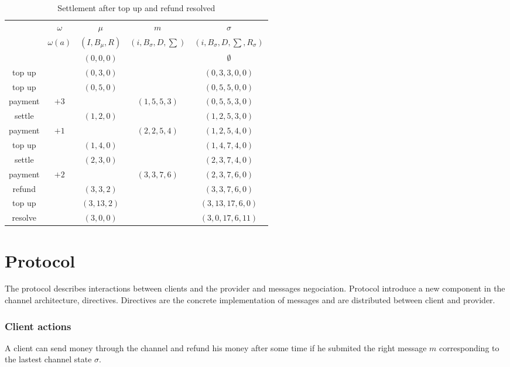 \documentclass{llncs}
\begin{document}
\begin{table}[t]
  \begin{tabularx}{\textwidth}{| S | S | C | C | C |}
       & $\omega$ & $\mu$ & $m$ & $\sigma$ \\ 
       & $\omega(a)$ & $(I,B_\mu,R)$ & $(i,B_\sigma,D,\sum)$ & $(i,B_\sigma,D,\sum,R_\sigma)$ \\
  \hhline{~====}
       & & $(0,0,0)$ & & $\emptyset$ \\ 
      top up & & $(0,3,0)$ & & $(0,3,3,0,0)$ \\
      top up & & $(0,5,0)$ & & $(0, 5, 5, 0,0)$ \\
      payment & $+3$ & & $(1, 5, 5, 3)$ & $(0, 5, 5, 3,0)$ \\
      settle & & $(1,2,0)$ & & $(1,2,5,3,0)$ \\
      payment & $+1$ & & $(2, 2, 5, 4)$ & $(1, 2, 5, 4,0)$ \\
      top up & & $(1,4,0)$ & & $(1, 4, 7, 4,0)$ \\
      settle & & $(2,3,0)$ & & $(2,3,7,4,0)$ \\
      payment & $+2$ & & $(3, 3, 7, 6)$ & $(2, 3, 7, 6,0)$ \\
      refund & & $(3,3,2)$ & & $(3, 3, 7, 6,0)$ \\
      top up & & $(3,13,2)$ & & $(3, 13, 17, 6,0)$ \\
      resolve & & $(3,0,0)$ & & $(3,0,17,6,11)$ \\
  \end{tabularx}
  \medskip
  \caption{Settlement after top up and refund resolved}
\end{table}

\section{Protocol} The protocol describes interactions between clients and the provider and messages negociation. Protocol introduce a new component in the channel architecture, directives. Directives are the concrete implementation of messages and are distributed between client and provider.

\subsubsection{Client actions} A client can send money through the channel and refund his money after some time if he submited the right message $m$ corresponding to the lastest channel state $\sigma$.
\end{document}
